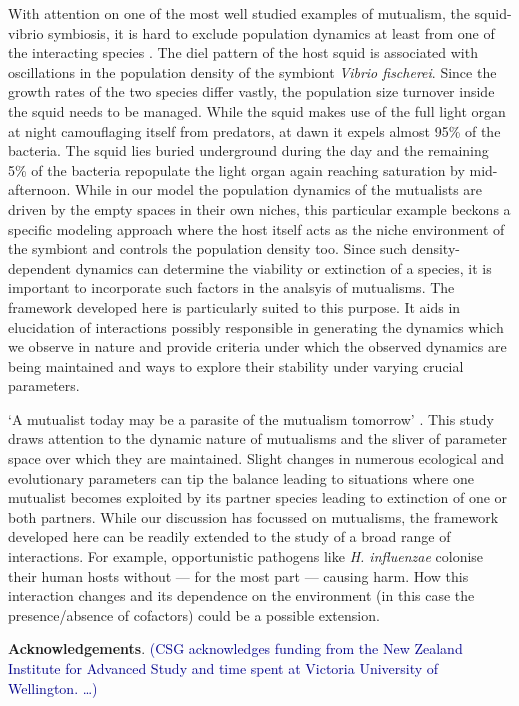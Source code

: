 \documentclass[12pt]{article}
\newcommand{\cha}[1]{\textcolor{darkblue}{(#1)}}
\begin{document}
With attention on one of the most well studied examples of mutualism, the squid-vibrio symbiosis, it is hard to exclude population dynamics at least from one of the interacting species \citep{nyholm:NRM:2004}. The diel pattern of the host squid is associated with oscillations in the population density of the symbiont \textit{Vibrio fischerei}. Since the growth rates of the two species differ vastly, the population size turnover inside the squid needs to be managed. While the squid makes use of the full light organ at night camouflaging itself from predators, at dawn it expels almost 95\% of the bacteria. The squid lies buried underground during the day and the remaining 5\% of the bacteria repopulate the light organ again reaching saturation by mid-afternoon. While in our model the population dynamics of the mutualists are driven by the empty spaces in their own niches, this particular example beckons a specific modeling approach where the host itself acts as the niche environment of the symbiont and controls the population density too. Since such density-dependent dynamics can determine the viability or extinction of a species, it is important to incorporate such factors in the analsyis of mutualisms.  The framework developed here is particularly suited to this purpose. It aids in elucidation of interactions possibly responsible in generating the dynamics which we observe in nature and provide criteria under which the observed dynamics are being maintained and ways to explore their stability under varying crucial parameters.

‘A mutualist today may be a parasite of the mutualism tomorrow’ \citep{janzen:bookchapter:1985}. 
This study draws attention to the dynamic nature of mutualisms and the sliver of parameter space over which they are maintained. Slight changes in numerous ecological and evolutionary parameters can tip the balance leading to situations where one mutualist becomes exploited by its partner species leading to extinction of one or both partners. While our discussion has focussed on mutualisms, the framework developed here can be readily extended to the study of a broad range of interactions.  For example, opportunistic pathogens like \textit{H. influenzae} colonise their human hosts without — for the most part — causing harm.  How this interaction changes and its dependence on the environment (in this case the presence/absence of cofactors) could be a possible extension.

\textbf{Acknowledgements}. \cha{CSG acknowledges funding from the New Zealand Institute for Advanced Study and time spent at Victoria University of Wellington. \ldots }
\end{document}
